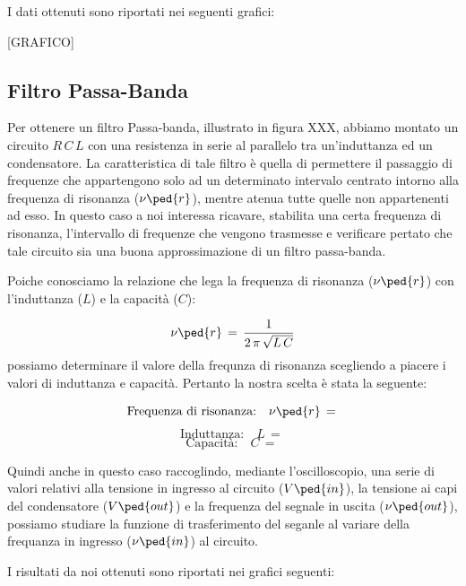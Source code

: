 I dati ottenuti sono riportati nei seguenti grafici:

[GRAFICO]

\subsection*{Filtro Passa-Banda}

Per ottenere un filtro Passa-banda, illustrato in figura XXX, abbiamo montato un circuito $R\,C\,L$ con una resistenza in serie al parallelo tra un'induttanza ed un condensatore.
La caratteristica di tale filtro è quella di permettere il passaggio di frequenze che appartengono solo ad un determinato intervalo centrato intorno alla frequenza di risonanza ($\nu\ped{r}$), mentre atenua tutte quelle non appartenenti ad esso.
In questo caso a noi interessa ricavare, stabilita una certa frequenza di risonanza, l'intervallo di frequenze che vengono trasmesse e verificare pertato che tale circuito sia una buona approssimazione di un filtro passa-banda.

Poiche conosciamo la relazione che lega la frequenza di risonanza ($\nu\ped{r}$) con l'induttanza ($L$) e la capacità ($C$):

\begin{equation}
	\nu\ped{r} \,=\, \frac{1}{2\,\pi\,\sqrt{L\,C}}
	\label{eq:risonanza banda}
\end{equation}
%
possiamo determinare il valore della frequnza di risonanza scegliendo a piacere i valori di induttanza e capacità. Pertanto la nostra scelta è stata la seguente:

\begin{equation*}
	\text{Frequenza di risonanza:} \quad \nu\ped{r} \,=\,
\end{equation*}
\begin{equation*}
	\text{Induttanza:} \quad L \,=\,
\end{equation*}
\begin{equation*}
	\text{Capacità:} \quad C \,=\,
\end{equation*}

Quindi anche in questo caso raccoglindo, mediante l'oscilloscopio, una serie di valori relativi alla tensione in ingresso al circuito ($V\ped{in}$), la tensione ai capi del condensatore ($V\ped{out}$) e la frequenza del segnale in uscita ($\nu\ped{out}$), possiamo studiare la funzione di trasferimento del seganle al variare della frequanza in ingresso ($\nu\ped{in}$) al circuito.

I risultati da noi ottenuti sono riportati nei grafici seguenti:


